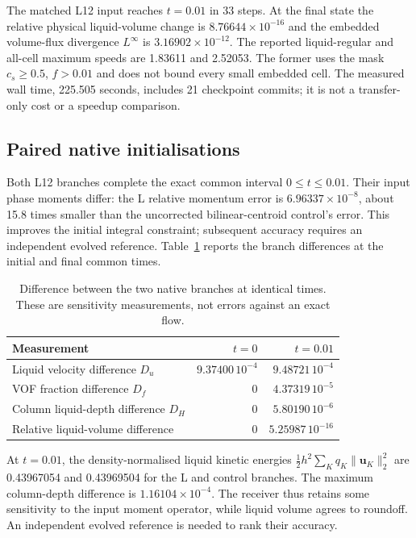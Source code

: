 \documentclass[10pt]{article}
\begin{document}
The matched L12 input reaches $t=0.01$ in 33 steps. At the final state the
relative physical liquid-volume change
is $8.76644\times10^{-16}$ and the embedded volume-flux divergence
$L^\infty$ is $3.16902\times10^{-12}$. The reported liquid-regular and
all-cell maximum speeds are 1.83611 and 2.52053. The former uses the
mask $c_s\ge0.5$, $f>0.01$ and does not bound every small embedded cell.
The measured wall time, 225.505 seconds, includes 21 checkpoint commits;
it is not a transfer-only cost or a speedup comparison.

\subsection{Paired native initialisations}
Both L12 branches complete the exact common interval $0\le t\le0.01$.
Their input phase moments differ:
the L relative momentum error is $6.96337\times10^{-8}$, about
15.8 times smaller than the uncorrected bilinear-centroid control's error.
This improves the initial integral constraint; subsequent accuracy requires
an independent evolved reference.
Table~\ref{tab:native-pair} reports the branch differences at the initial
and final common times.

\begin{table}[htbp]\centering
\caption{Difference between the two native branches at identical times.
These are sensitivity measurements, not errors against an exact flow.}
\label{tab:native-pair}
\begin{tabular}{lrr}\toprule
Measurement & $t=0$ & $t=0.01$\\\midrule
Liquid velocity difference $D_u$ & $9.37400\,10^{-4}$ & $9.48721\,10^{-4}$\\
VOF fraction difference $D_f$ & 0 & $4.37319\,10^{-5}$\\
Column liquid-depth difference $D_H$ & 0 & $5.80190\,10^{-6}$\\
Relative liquid-volume difference & 0 & $5.25987\,10^{-16}$\\
\bottomrule\end{tabular}
\end{table}

At $t=0.01$, the density-normalised liquid kinetic energies
$\tfrac12h^2\sum_Kq_K\|\boldsymbol u_K\|_2^2$ are 0.43967054
and 0.43969504 for the L and control branches. The maximum column-depth
difference is $1.16104\times10^{-4}$. The receiver thus retains some
sensitivity to the input moment operator, while liquid volume agrees to
roundoff. An independent evolved reference is needed to rank their accuracy.
\end{document}
